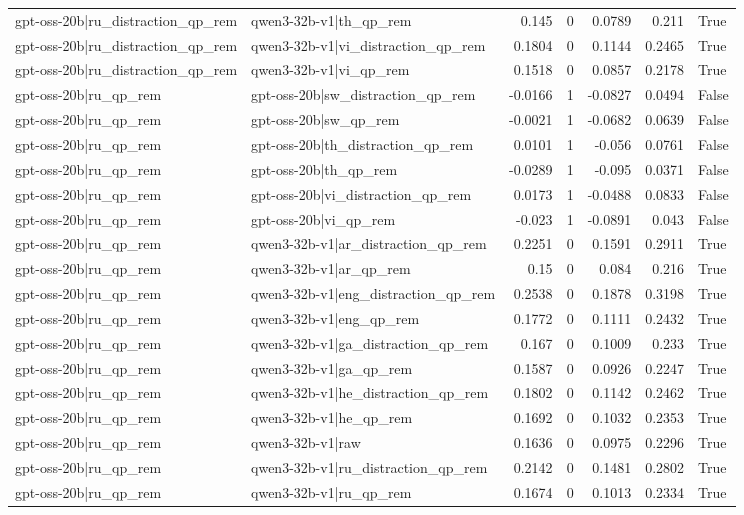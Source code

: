 \begin{table}
\begin{tabular}{l l r r r r l}
gpt-oss-20b|ru_distraction_qp_rem & qwen3-32b-v1|th_qp_rem & 0.145 & 0 & 0.0789 & 0.211 & True \\
gpt-oss-20b|ru_distraction_qp_rem & qwen3-32b-v1|vi_distraction_qp_rem & 0.1804 & 0 & 0.1144 & 0.2465 & True \\
gpt-oss-20b|ru_distraction_qp_rem & qwen3-32b-v1|vi_qp_rem & 0.1518 & 0 & 0.0857 & 0.2178 & True \\
gpt-oss-20b|ru_qp_rem & gpt-oss-20b|sw_distraction_qp_rem & -0.0166 & 1 & -0.0827 & 0.0494 & False \\
gpt-oss-20b|ru_qp_rem & gpt-oss-20b|sw_qp_rem & -0.0021 & 1 & -0.0682 & 0.0639 & False \\
gpt-oss-20b|ru_qp_rem & gpt-oss-20b|th_distraction_qp_rem & 0.0101 & 1 & -0.056 & 0.0761 & False \\
gpt-oss-20b|ru_qp_rem & gpt-oss-20b|th_qp_rem & -0.0289 & 1 & -0.095 & 0.0371 & False \\
gpt-oss-20b|ru_qp_rem & gpt-oss-20b|vi_distraction_qp_rem & 0.0173 & 1 & -0.0488 & 0.0833 & False \\
gpt-oss-20b|ru_qp_rem & gpt-oss-20b|vi_qp_rem & -0.023 & 1 & -0.0891 & 0.043 & False \\
gpt-oss-20b|ru_qp_rem & qwen3-32b-v1|ar_distraction_qp_rem & 0.2251 & 0 & 0.1591 & 0.2911 & True \\
gpt-oss-20b|ru_qp_rem & qwen3-32b-v1|ar_qp_rem & 0.15 & 0 & 0.084 & 0.216 & True \\
gpt-oss-20b|ru_qp_rem & qwen3-32b-v1|eng_distraction_qp_rem & 0.2538 & 0 & 0.1878 & 0.3198 & True \\
gpt-oss-20b|ru_qp_rem & qwen3-32b-v1|eng_qp_rem & 0.1772 & 0 & 0.1111 & 0.2432 & True \\
gpt-oss-20b|ru_qp_rem & qwen3-32b-v1|ga_distraction_qp_rem & 0.167 & 0 & 0.1009 & 0.233 & True \\
gpt-oss-20b|ru_qp_rem & qwen3-32b-v1|ga_qp_rem & 0.1587 & 0 & 0.0926 & 0.2247 & True \\
gpt-oss-20b|ru_qp_rem & qwen3-32b-v1|he_distraction_qp_rem & 0.1802 & 0 & 0.1142 & 0.2462 & True \\
gpt-oss-20b|ru_qp_rem & qwen3-32b-v1|he_qp_rem & 0.1692 & 0 & 0.1032 & 0.2353 & True \\
gpt-oss-20b|ru_qp_rem & qwen3-32b-v1|raw & 0.1636 & 0 & 0.0975 & 0.2296 & True \\
gpt-oss-20b|ru_qp_rem & qwen3-32b-v1|ru_distraction_qp_rem & 0.2142 & 0 & 0.1481 & 0.2802 & True \\
gpt-oss-20b|ru_qp_rem & qwen3-32b-v1|ru_qp_rem & 0.1674 & 0 & 0.1013 & 0.2334 & True \\

\end{tabular}
\end{table}
